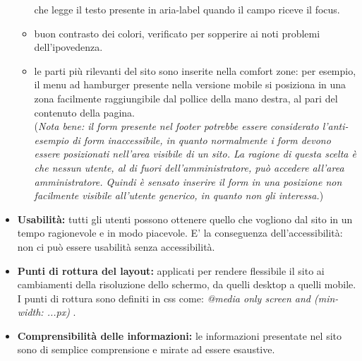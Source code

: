 \begin{itemize}
\begin{itemize}
		che legge il testo presente in aria-label quando il campo riceve il focus. 
		\item buon contrasto dei colori, verificato per sopperire ai noti problemi dell'ipovedenza.
		\item le parti più rilevanti del sito sono inserite nella comfort zone: per esempio, il menu ad hamburger presente nella versione mobile si 
		posiziona in una zona facilmente raggiungibile dal pollice della mano destra, al pari del contenuto della pagina.\\ 
		(\emph{Nota bene: il form presente nel footer potrebbe essere considerato l'anti-esempio di form inaccessibile, in quanto normalmente i form 
		devono essere posizionati nell'area visibile di un sito. La ragione di questa scelta è che nessun utente, al di fuori dell'amministratore,
		può accedere all'area amministratore. Quindi è sensato inserire il form in una posizione non facilmente visibile all'utente generico, in quanto non gli interessa.}) 
	\end{itemize}
	\item \textbf{Usabilità:} tutti gli utenti possono ottenere quello che vogliono dal sito in un tempo ragionevole e in modo piacevole. E' la conseguenza dell'accessibilità: 
	non ci può essere usabilità senza accessibilità. 
	\item \textbf{Punti di rottura del layout:} applicati per rendere flessibile il sito ai cambiamenti della risoluzione dello schermo, da quelli desktop a quelli mobile.\\
	I punti di rottura sono definiti in css come: \emph{@media only screen and (min-width: ...px) }.
	\item \textbf{Comprensibilità delle informazioni:} le informazioni presentate nel sito sono di semplice comprensione e mirate ad essere esaustive.\\
\end{itemize}
